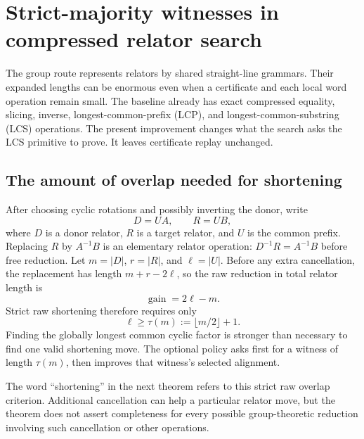 \section{Strict-majority witnesses in compressed relator search}
\label{sec:overlap}

The group route represents relators by shared straight-line grammars. Their
expanded lengths can be enormous even when a certificate and each local word
operation remain small. The baseline already has exact compressed equality,
slicing, inverse, longest-common-prefix (LCP), and longest-common-substring
(LCS) operations. The present improvement changes what the search asks the
LCS primitive to prove. It leaves certificate replay unchanged.

\subsection{The amount of overlap needed for shortening}

After choosing cyclic rotations and possibly inverting the donor, write
\[
 D=UA,\qquad R=UB,
\]
where $D$ is a donor relator, $R$ is a target relator, and $U$ is the common
prefix. Replacing $R$ by $A^{-1}B$ is an elementary relator operation:
$D^{-1}R=A^{-1}B$ before free reduction. Let $m=|D|$, $r=|R|$, and
$\ell=|U|$. Before any extra cancellation, the replacement has length
$m+r-2\ell$, so the raw reduction in total relator length is
\begin{equation}
 \operatorname{gain}=2\ell-m.
 \label{eq:overlap-gain}
\end{equation}
Strict raw shortening therefore requires only
\[
 \ell\geq\tau(m):=\lfloor m/2\rfloor+1.
\]
Finding the globally longest common cyclic factor is stronger than necessary
to find one valid shortening move. The optional policy asks first for a
witness of length $\tau(m)$, then improves that witness's selected alignment.

The word ``shortening'' in the next theorem refers to this strict raw
overlap criterion. Additional cancellation can help a particular relator
move, but the theorem does not assert completeness for every possible
group-theoretic reduction involving such cancellation or other operations.

